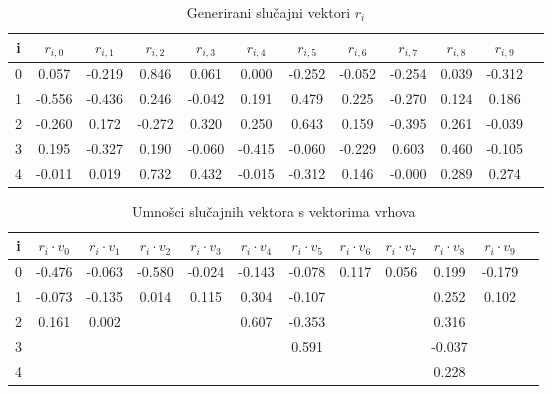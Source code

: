 \documentclass[diplomskirad]{fer}
\begin{document}
\begin{table}[h]
 \caption{Generirani slučajni vektori $r_i$}
 \label{sluc_vekt}
  \begin{tabular}{|c|c|c|c|c|c|c|c|c|c|c|c|}
    \hline
    i & $r_{i,0}$ & $r_{i,1}$ & $r_{i,2}$ & $r_{i,3}$ & $r_{i,4}$ & $r_{i,5}$ & $r_{i,6}$ & $r_{i,7}$ & $r_{i,8}$ & $r_{i,9}$ \\
    \hline
    \hline
    0 & 0.057 & -0.219 & 0.846 & 0.061 & 0.000 & -0.252 & -0.052 & -0.254 & 0.039 & -0.312 \\
    \hline
    1 & -0.556 & -0.436 & 0.246 & -0.042 & 0.191 & 0.479 & 0.225 & -0.270 & 0.124 & 0.186 \\
    \hline
    2 & -0.260 & 0.172 & -0.272 & 0.320 & 0.250 & 0.643 & 0.159 & -0.395 & 0.261 & -0.039 \\
    \hline
    3 & 0.195 & -0.327 & 0.190 & -0.060 & -0.415 & -0.060 & -0.229 & 0.603 & 0.460 & -0.105 \\
    \hline
    4 & -0.011 & 0.019 & 0.732 & 0.432 & -0.015 & -0.312 & 0.146 & -0.000 & 0.289 & 0.274\\
    \hline
    \end{tabular}
\end{table}

\begin{table}[h]
  \caption{Umnošci slučajnih vektora s vektorima vrhova}
  \label{skalar}
  \begin{tabular}{|c|c|c|c|c|c|c|c|c|c|c|c|}
    \hline
    i & $r_i \cdot v_0 $ & $r_i \cdot v_1 $ & $r_i \cdot v_2 $ & $r_i \cdot v_3 $ & $r_i \cdot v_4 $ & $r_i \cdot v_5 $ & $r_i \cdot v_6 $ & $r_i \cdot v_7 $ & $r_i \cdot v_8 $ & $r_i \cdot v_9 $ \\
    \hline
    \hline
    0 & -0.476 & -0.063 & -0.580 & -0.024 & -0.143 & -0.078 & 0.117 & 0.056 & 0.199 & -0.179 \\
    \hline
    1 & -0.073 & -0.135 & 0.014 & 0.115 & 0.304 & -0.107&& & 0.252 & 0.102 \\
    \hline
    2 & 0.161 & 0.002 & & & 0.607 & -0.353 & & & 0.316 & \\
    \hline
    3 & & & & & & 0.591 & & & -0.037 & \\
    \hline
    4 & & & & & & & & & 0.228 & \\
    \hline
  \end{tabular}
\end{table}
\end{document}
